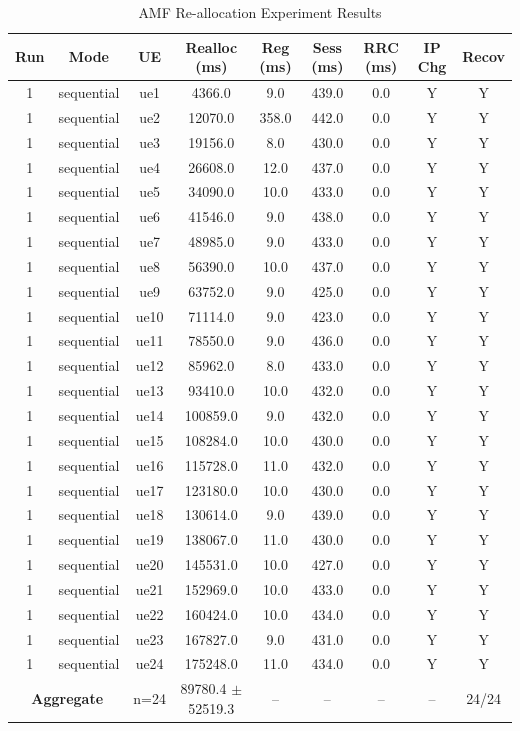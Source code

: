 \begin{table}[ht]
\centering
\begin{tabular}{|c|c|c|c|c|c|c|c|c|}
\hline
Run & Mode & UE & Realloc (ms) & Reg (ms) & Sess (ms) & RRC (ms) & IP Chg & Recov \\
\hline
1 & sequential & ue1 & 4366.0 & 9.0 & 439.0 & 0.0 & Y & Y \\
1 & sequential & ue2 & 12070.0 & 358.0 & 442.0 & 0.0 & Y & Y \\
1 & sequential & ue3 & 19156.0 & 8.0 & 430.0 & 0.0 & Y & Y \\
1 & sequential & ue4 & 26608.0 & 12.0 & 437.0 & 0.0 & Y & Y \\
1 & sequential & ue5 & 34090.0 & 10.0 & 433.0 & 0.0 & Y & Y \\
1 & sequential & ue6 & 41546.0 & 9.0 & 438.0 & 0.0 & Y & Y \\
1 & sequential & ue7 & 48985.0 & 9.0 & 433.0 & 0.0 & Y & Y \\
1 & sequential & ue8 & 56390.0 & 10.0 & 437.0 & 0.0 & Y & Y \\
1 & sequential & ue9 & 63752.0 & 9.0 & 425.0 & 0.0 & Y & Y \\
1 & sequential & ue10 & 71114.0 & 9.0 & 423.0 & 0.0 & Y & Y \\
1 & sequential & ue11 & 78550.0 & 9.0 & 436.0 & 0.0 & Y & Y \\
1 & sequential & ue12 & 85962.0 & 8.0 & 433.0 & 0.0 & Y & Y \\
1 & sequential & ue13 & 93410.0 & 10.0 & 432.0 & 0.0 & Y & Y \\
1 & sequential & ue14 & 100859.0 & 9.0 & 432.0 & 0.0 & Y & Y \\
1 & sequential & ue15 & 108284.0 & 10.0 & 430.0 & 0.0 & Y & Y \\
1 & sequential & ue16 & 115728.0 & 11.0 & 432.0 & 0.0 & Y & Y \\
1 & sequential & ue17 & 123180.0 & 10.0 & 430.0 & 0.0 & Y & Y \\
1 & sequential & ue18 & 130614.0 & 9.0 & 439.0 & 0.0 & Y & Y \\
1 & sequential & ue19 & 138067.0 & 11.0 & 430.0 & 0.0 & Y & Y \\
1 & sequential & ue20 & 145531.0 & 10.0 & 427.0 & 0.0 & Y & Y \\
1 & sequential & ue21 & 152969.0 & 10.0 & 433.0 & 0.0 & Y & Y \\
1 & sequential & ue22 & 160424.0 & 10.0 & 434.0 & 0.0 & Y & Y \\
1 & sequential & ue23 & 167827.0 & 9.0 & 431.0 & 0.0 & Y & Y \\
1 & sequential & ue24 & 175248.0 & 11.0 & 434.0 & 0.0 & Y & Y \\
\multicolumn{2}{|c|}{\textbf{Aggregate}} & n=24 & 89780.4 $\pm$ 52519.3 & -- & -- & -- & -- & 24/24 \\
\hline
\end{tabular}
\caption{AMF Re-allocation Experiment Results}
\label{tab:amf_realloc}
\end{table}

